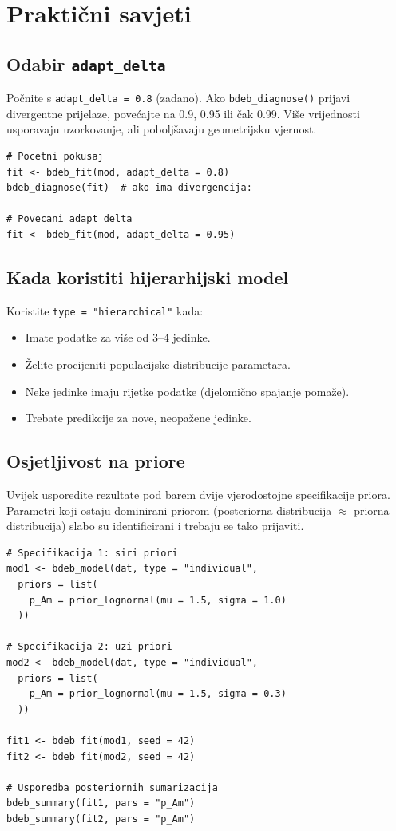 \documentclass[11pt,a4paper]{article}
\newcommand{\fn}[1]{\texttt{#1()}}
\newcommand{\code}[1]{\texttt{#1}}
\begin{document}
\section{Praktični savjeti}
\label{sec:savjeti}

\subsection{Odabir \code{adapt\_delta}}

Počnite s \code{adapt\_delta = 0.8} (zadano).  Ako \fn{bdeb\_diagnose}
prijavi divergentne prijelaze, povećajte na 0.9, 0.95 ili čak 0.99.
Više vrijednosti usporavaju uzorkovanje, ali poboljšavaju geometrijsku
vjernost.

\begin{lstlisting}
# Pocetni pokusaj
fit <- bdeb_fit(mod, adapt_delta = 0.8)
bdeb_diagnose(fit)  # ako ima divergencija:

# Povecani adapt_delta
fit <- bdeb_fit(mod, adapt_delta = 0.95)
\end{lstlisting}

\subsection{Kada koristiti hijerarhijski model}

Koristite \code{type = "hierarchical"} kada:
\begin{itemize}[nosep]
  \item Imate podatke za više od 3--4 jedinke.
  \item Želite procijeniti populacijske distribucije parametara.
  \item Neke jedinke imaju rijetke podatke (djelomično spajanje pomaže).
  \item Trebate predikcije za nove, neopažene jedinke.
\end{itemize}

\subsection{Osjetljivost na priore}

Uvijek usporedite rezultate pod barem dvije vjerodostojne specifikacije
priora.  Parametri koji ostaju dominirani priorom (posteriorna
distribucija $\approx$ priorna distribucija) slabo su identificirani i
trebaju se tako prijaviti.

\begin{lstlisting}
# Specifikacija 1: siri priori
mod1 <- bdeb_model(dat, type = "individual",
  priors = list(
    p_Am = prior_lognormal(mu = 1.5, sigma = 1.0)
  ))

# Specifikacija 2: uzi priori
mod2 <- bdeb_model(dat, type = "individual",
  priors = list(
    p_Am = prior_lognormal(mu = 1.5, sigma = 0.3)
  ))

fit1 <- bdeb_fit(mod1, seed = 42)
fit2 <- bdeb_fit(mod2, seed = 42)

# Usporedba posteriornih sumarizacija
bdeb_summary(fit1, pars = "p_Am")
bdeb_summary(fit2, pars = "p_Am")
\end{lstlisting}
\end{document}
